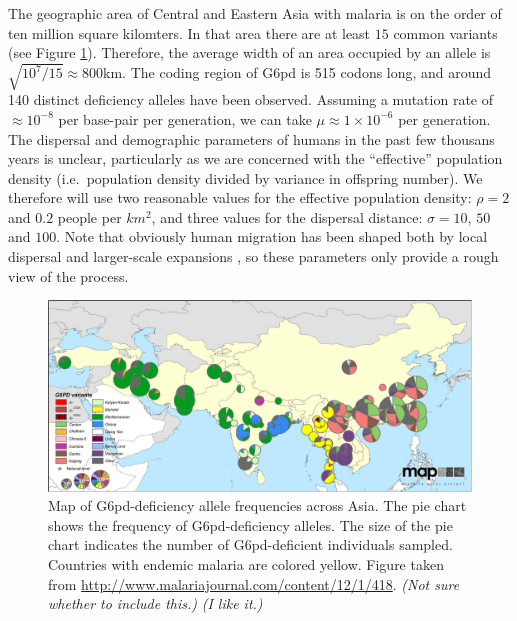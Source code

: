 \documentclass{article}
\newcommand{\gc}[1]{{\it\color{green}(#1)} }
\newcommand{\plr}[1]{{\it\color{blue}(#1)}}
\begin{document}
The geographic area of Central and Eastern Asia with malaria is 
on the order of ten million square kilomters.
In that area there are at least $15$ common variants \citep{Howes-g6pd-variants} (see Figure \ref{fig-G6PD-map}). 
Therefore, the average width of an area occupied by an allele is $\sqrt{10^7/15} \approx  800$km. 
The coding region of G6pd is 515 codons long, 
and around 140 distinct deficiency alleles have been observed. 
Assuming a mutation rate of $\approx 10^{-8}$ per base-pair per generation, 
we can take $\mu \approx 1 \times 10^{-6}$ per generation. 
The dispersal and demographic parameters of humans in the past few thousans years is unclear,
particularly as we are concerned with the ``effective'' population density
(i.e.\ population density divided by variance in offspring number).
We therefore will use two reasonable values for the effective population density: $\rho=2$ and $0.2$ people per $km^2$,
and three values for the dispersal distance: $\sigma=10$, $50$ and $100$.
Note that obviously human migration has been shaped both by local dispersal and larger-scale expansions 
\citep[see ][for a recent discussion]{}, 
so these parameters only provide a rough view of the process.

\begin{figure}[ht]
\begin{center}
  \includegraphics[width=1.0\textwidth]{G6pd_Howes_et_al_1475-2875-12-418-4}   %
\caption{ 
Map of G6pd-deficiency allele frequencies across Asia. 
The pie chart shows the frequency of G6pd-deficiency alleles. 
The size of the pie chart indicates the number of G6pd-deficient individuals sampled.
Countries with endemic malaria are colored yellow. 
Figure taken from \citet{Howes-g6pd-variants}
\url{http://www.malariajournal.com/content/12/1/418}. 
\gc{Not sure whether to include this.}
\plr{I like it.}
} \label{fig-G6PD-map}
\end{center}
\end{figure}
\end{document}
